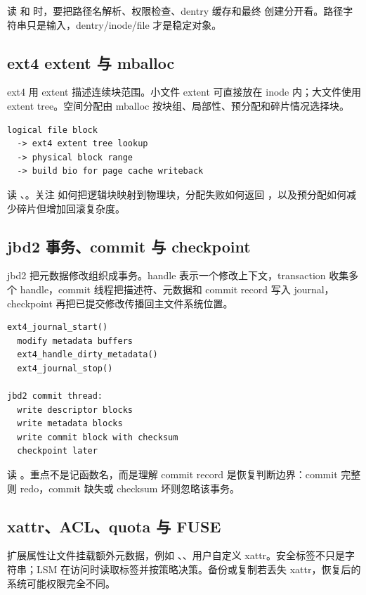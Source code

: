 读  和  时，要把路径名解析、权限检查、dentry 缓存和最终  创建分开看。路径字符串只是输入，dentry/inode/file 才是稳定对象。

\subsection{ext4 extent 与 mballoc}

ext4 用 extent 描述连续块范围。小文件 extent 可直接放在 inode 内；大文件使用 extent tree。空间分配由 mballoc 按块组、局部性、预分配和碎片情况选择块。

\begin{lstlisting}
logical file block
  -> ext4 extent tree lookup
  -> physical block range
  -> build bio for page cache writeback
\end{lstlisting}

读 、。关注  如何把逻辑块映射到物理块，分配失败如何返回 ，以及预分配如何减少碎片但增加回滚复杂度。

\subsection{jbd2 事务、commit 与 checkpoint}

jbd2 把元数据修改组织成事务。handle 表示一个修改上下文，transaction 收集多个 handle，commit 线程把描述符、元数据和 commit record 写入 journal，checkpoint 再把已提交修改传播回主文件系统位置。

\begin{lstlisting}
ext4_journal_start()
  modify metadata buffers
  ext4_handle_dirty_metadata()
  ext4_journal_stop()

jbd2 commit thread:
  write descriptor blocks
  write metadata blocks
  write commit block with checksum
  checkpoint later
\end{lstlisting}

读 。重点不是记函数名，而是理解 commit record 是恢复判断边界：commit 完整则 redo，commit 缺失或 checksum 坏则忽略该事务。

\subsection{xattr、ACL、quota 与 FUSE}

扩展属性让文件挂载额外元数据，例如 、、用户自定义 xattr。安全标签不只是字符串；LSM 在访问时读取标签并按策略决策。备份或复制若丢失 xattr，恢复后的系统可能权限完全不同。

